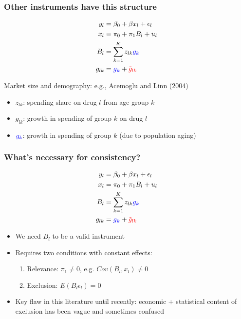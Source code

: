 \documentclass[notes,11pt, aspectratio=169]{beamer}
\begin{document}
\begin{frame}
\addtocounter{framenumber}{-1}
\frametitle{Other instruments have this structure}

\begin{align}
  y_l&= \beta_0 + \beta x_l + \epsilon_l \notag \\
  x_l&= \pi_0 + \pi_{1} B_l + u_l \notag \\  
B_l &=  \sum_{k=1}^{K}z_{lk} \textcolor{blue}{g_{k}} \notag \\
g_{lk} &=   \textcolor{blue}{g}_{ \textcolor{blue}{k}}+  \textcolor{red}{\tilde{g}_{lk}}  \notag 
\end{align}

Market size and demography: e.g., Acemoglu and Linn (2004)
\begin{itemize}
\item $z_{lk}$: spending share on drug $l$ from age group $k$
\item $g_{lk}$:  growth in spending of group $k$ on drug $l$
\item $\textcolor{blue}{g_k}$: growth in spending of group $k$ (due to population aging)
\end{itemize}


\end{frame}

\begin{frame}
\frametitle{What's necessary for consistency?}

\begin{align}
  y_l&= \beta_0 + \beta x_l + \epsilon_l \notag \\
  x_l&= \pi_0 + \pi_{1} B_l + u_l \notag \\  
  B_l &=  \sum_{k=1}^{K}z_{lk} \textcolor{blue}{g_{k}} \notag \\
  g_{lk} &=   \textcolor{blue}{g}_{ \textcolor{blue}{k}}+  \textcolor{red}{\tilde{g}_{lk}}  \notag 
\end{align}

\begin{itemize}
\item We need $B_{l}$ to be a valid instrument
\item Requires two conditions with constant effects:
  \begin{enumerate}
  \item Relevance: $\pi_{1} \not=0$, e.g. $Cov(B_{l}, x_{l}) \not= 0$
  \item Exclusion: $E(B_{l}\epsilon_{l}) = 0$
  \end{enumerate}
\item Key flaw in this literature until recently: economic +
  statistical content of exclusion has been vague and sometimes confused
\end{itemize}

\end{frame}
\end{document}
